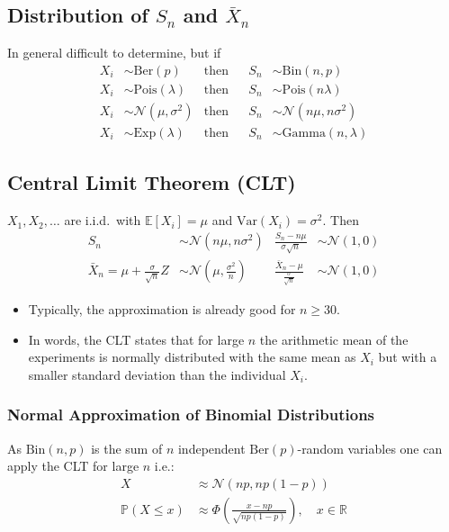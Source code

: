 \subsection[LLN Examples]{Distribution of $S_n$ and $\bar{X}_n$}
In general difficult to determine, but if
\noindent\begin{align*}
    X_i & \sim \mathrm{Ber}(p)            & \text{then} &  & S_n & \sim \mathrm{Bin}(n,p)            \\
    X_i & \sim \mathrm{Pois}(\lambda)     & \text{then} &  & S_n & \sim \mathrm{Pois}(n\lambda)      \\
    X_i & \sim \mathcal{N}(\mu, \sigma^2) & \text{then} &  & S_n & \sim \mathcal{N}(n\mu, n\sigma^2) \\
    X_i & \sim \mathrm{Exp}(\lambda)      & \text{then} &  & S_n & \sim \mathrm{Gamma}(n, \lambda)
\end{align*}

\subsection{Central Limit Theorem (CLT)}
$X_1, X_2, \ldots$ are i.i.d.\ with $\mathbb{E}[X_i]=\mu$ and $\mathrm{Var}(X_i)=\sigma^2$. Then
\begin{align*}
    S_n                                      & \sim \mathcal{N}(n\mu, n\sigma^2)         & \frac{S_n-n\mu}{\sigma \sqrt{n}}              & \sim\mathcal{N}(1,0) \\
    \bar{X}_n = \mu+\frac{\sigma}{\sqrt{n}}Z & \sim \mathcal{N}(\mu, \frac{\sigma^2}{n}) & \frac{\bar{X}_n-\mu}{\frac{\sigma}{\sqrt{n}}} & \sim\mathcal{N}(1,0)
\end{align*}


\begin{itemize}
    \item Typically, the approximation is already good for $n \geq 30$.
    \item In words, the CLT states that for large $n$ the arithmetic mean of the experiments is normally distributed with the same mean as $X_i$ but with a smaller standard deviation than the individual $X_i$.
\end{itemize}
\subsubsection{Normal Approximation of Binomial Distributions}\label{norm_approx_bin}
As $\mathrm{Bin}(n,p)$ is the sum of $n$ independent $\mathrm{Ber}(p)$-random variables one can apply the CLT for large $n$ i.e.:
\begin{align*}
    X                   & \approx\mathcal{N}(np,np(1-p))                                           \\
    \mathbb{P}(X\leq x) & \approx\Phi\left(\frac{x-np}{\sqrt{np(1-p)}}\right),\quad x\in\mathbb{R}
\end{align*}
